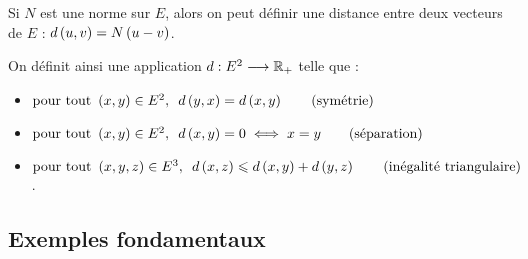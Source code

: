 Si \(N\) est une norme sur \(E\), alors on peut définir une distance entre deux vecteurs de \(E\) : \(d\left(u,v\right)=N\left(u-v\right)\).

On définit ainsi une application \(d:E^2\longrightarrow\mathbb{R}_+\) telle que :

\begin{itemize}
    \item \(\quantifs{\tpt\paren{x,y}\in E^2}d\paren{y,x}=d\paren{x,y}\qquad\text{(symétrie)}\) \\
    \item \(\quantifs{\tpt\paren{x,y}\in E^2}d\paren{x,y}=0\ssi x=y\qquad\text{(séparation)}\) \\
    \item \(\quantifs{\tpt\paren{x,y,z}\in E^3}d\paren{x,z}\leq d\paren{x,y}+d\paren{y,z}\qquad\text{(inégalité triangulaire)}\).
\end{itemize}

\subsection{Exemples fondamentaux}

